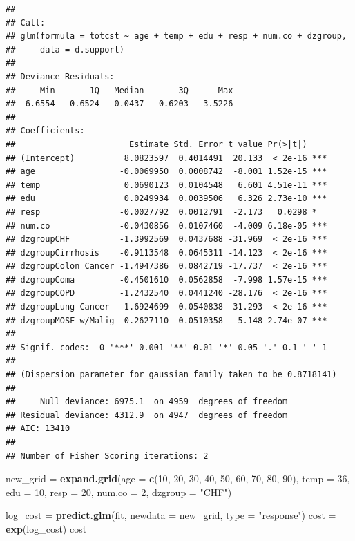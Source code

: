 \documentclass[
]{article}
\newenvironment{Shaded}{\begin{snugshade}}{\end{snugshade}}
\newcommand{\DataTypeTok}[1]{\textcolor[rgb]{0.13,0.29,0.53}{#1}}
\newcommand{\DecValTok}[1]{\textcolor[rgb]{0.00,0.00,0.81}{#1}}
\newcommand{\KeywordTok}[1]{\textcolor[rgb]{0.13,0.29,0.53}{\textbf{#1}}}
\newcommand{\NormalTok}[1]{#1}
\newcommand{\StringTok}[1]{\textcolor[rgb]{0.31,0.60,0.02}{#1}}
\begin{document}
\begin{verbatim}
## 
## Call:
## glm(formula = totcst ~ age + temp + edu + resp + num.co + dzgroup, 
##     data = d.support)
## 
## Deviance Residuals: 
##     Min       1Q   Median       3Q      Max  
## -6.6554  -0.6524  -0.0437   0.6203   3.5226  
## 
## Coefficients:
##                       Estimate Std. Error t value Pr(>|t|)    
## (Intercept)          8.0823597  0.4014491  20.133  < 2e-16 ***
## age                 -0.0069950  0.0008742  -8.001 1.52e-15 ***
## temp                 0.0690123  0.0104548   6.601 4.51e-11 ***
## edu                  0.0249934  0.0039506   6.326 2.73e-10 ***
## resp                -0.0027792  0.0012791  -2.173   0.0298 *  
## num.co              -0.0430856  0.0107460  -4.009 6.18e-05 ***
## dzgroupCHF          -1.3992569  0.0437688 -31.969  < 2e-16 ***
## dzgroupCirrhosis    -0.9113548  0.0645311 -14.123  < 2e-16 ***
## dzgroupColon Cancer -1.4947386  0.0842719 -17.737  < 2e-16 ***
## dzgroupComa         -0.4501610  0.0562858  -7.998 1.57e-15 ***
## dzgroupCOPD         -1.2432540  0.0441240 -28.176  < 2e-16 ***
## dzgroupLung Cancer  -1.6924699  0.0540838 -31.293  < 2e-16 ***
## dzgroupMOSF w/Malig -0.2627110  0.0510358  -5.148 2.74e-07 ***
## ---
## Signif. codes:  0 '***' 0.001 '**' 0.01 '*' 0.05 '.' 0.1 ' ' 1
## 
## (Dispersion parameter for gaussian family taken to be 0.8718141)
## 
##     Null deviance: 6975.1  on 4959  degrees of freedom
## Residual deviance: 4312.9  on 4947  degrees of freedom
## AIC: 13410
## 
## Number of Fisher Scoring iterations: 2
\end{verbatim}

\begin{Shaded}
\begin{Highlighting}[]
\NormalTok{new_grid =}\StringTok{ }\KeywordTok{expand.grid}\NormalTok{(}\DataTypeTok{age =} \KeywordTok{c}\NormalTok{(}\DecValTok{10}\NormalTok{, }\DecValTok{20}\NormalTok{, }\DecValTok{30}\NormalTok{, }\DecValTok{40}\NormalTok{, }\DecValTok{50}\NormalTok{, }\DecValTok{60}\NormalTok{, }\DecValTok{70}\NormalTok{, }\DecValTok{80}\NormalTok{, }\DecValTok{90}\NormalTok{), }\DataTypeTok{temp =} \DecValTok{36}\NormalTok{, }\DataTypeTok{edu =} \DecValTok{10}\NormalTok{, }
    \DataTypeTok{resp =} \DecValTok{20}\NormalTok{, }\DataTypeTok{num.co =} \DecValTok{2}\NormalTok{, }\DataTypeTok{dzgroup =} \StringTok{"CHF"}\NormalTok{)}

\NormalTok{log_cost =}\StringTok{ }\KeywordTok{predict.glm}\NormalTok{(fit, }\DataTypeTok{newdata =}\NormalTok{ new_grid, }\DataTypeTok{type =} \StringTok{"response"}\NormalTok{)}
\NormalTok{cost =}\StringTok{ }\KeywordTok{exp}\NormalTok{(log_cost)}
\NormalTok{cost}
\end{Highlighting}
\end{Shaded}
\end{document}
